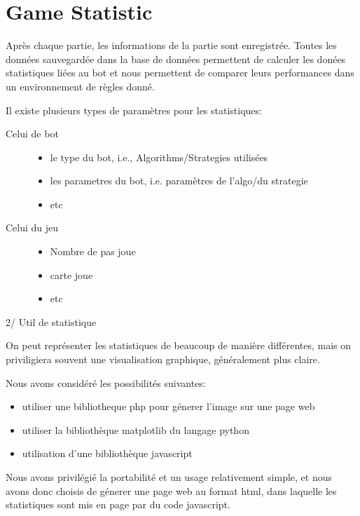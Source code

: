 \section{Game Statistic}

Après chaque partie, les informations de la partie sont enregistrée. Toutes les données sauvegardée dans la base de données permettent de calculer les donées statistiques liées au bot et nous permettent de comparer leurs performances dans un environnement de règles donné.

Il existe plusieurs types de paramètres pour les statistiques:\\

\begin{description}
\item[Celui de bot]
  \begin{itemize}
  \item le type du bot, i.e., Algorithms/Strategies utilisées
  \item les parametres du bot, i.e. paramètres de l'algo/du strategie
  \item etc
  \end{itemize}
\item[Celui du jeu]
  \begin{itemize}
  \item Nombre de pas joue
  \item carte joue
  \item etc
  \end{itemize}
\end{description}


2/ Util de statistique

On peut représenter les statistiques de beaucoup de manière différentes, mais on priviligiera souvent une visualisation graphique, généralement plus claire.

Nous avons considéré les possibilités suivantes:\\
\begin{itemize}
\item utiliser une bibliotheque php pour génerer l'image sur une page web
\item utiliser la bibliothèque matplotlib du langage python
\item utilisation d'une bibliothèque javascript
\end{itemize}

Nous avons privilégié la portabilité et un usage relativement simple, et nous avons donc choisis de génerer une page web au format html, dans laquelle les statistiques sont mis en page par du code javascript.


